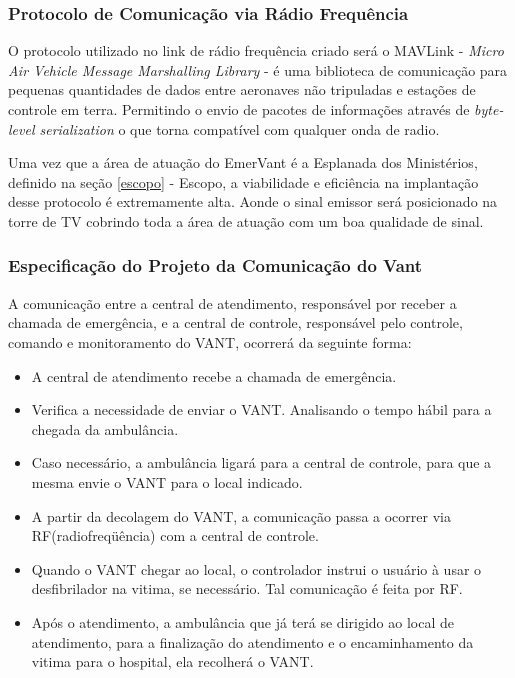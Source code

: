 \subsubsection{Protocolo de Comunicação via Rádio Frequência}

O protocolo utilizado no link de rádio frequência criado será o MAVLink - \textit{Micro Air Vehicle Message Marshalling Library} - é uma biblioteca de comunicação para 
pequenas quantidades de dados entre aeronaves não tripuladas e estações de controle em terra. 
Permitindo o envio de pacotes de informações através de \textit{byte-level serialization} o que torna 
compatível com qualquer onda de radio.\cite{mavlink}

Uma vez que a área de atuação do EmerVant é a Esplanada dos Ministérios, 
definido na seção \ref{escopo} - Escopo, a viabilidade e eficiência na implantação desse protocolo é
extremamente alta. Aonde o sinal emissor será posicionado na torre de TV cobrindo toda a 
área de atuação com um boa qualidade de sinal. 

\subsubsection{Especificação do Projeto da Comunicação do Vant}

A comunicação entre a central de atendimento, responsável por receber a chamada de emergência, e a central de controle, responsável pelo controle, comando e monitoramento do VANT, ocorrerá da seguinte forma:

\begin{itemize}
  \item A central de atendimento recebe a chamada de emergência.
  \item Verifica a necessidade de enviar o VANT. Analisando o tempo hábil para a chegada da ambulância.
  \item Caso necessário, a ambulância  ligará para a central de controle, para que a mesma envie o VANT para o local indicado.
  \item A partir da decolagem do VANT, a comunicação passa a ocorrer via RF(radiofreqüência) com a central de controle.
  \item Quando o VANT chegar ao local, o controlador instrui o usuário à usar o desfibrilador na vitima, se necessário. Tal comunicação é feita por RF.
  \item Após o atendimento, a ambulância que já terá se dirigido ao local de atendimento, para a finalização do atendimento e o encaminhamento da vitima para o hospital, ela recolherá o VANT.
 
\end{itemize}

